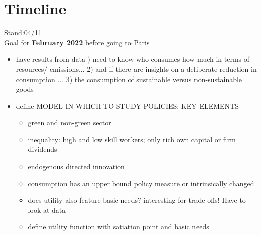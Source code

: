 \section{Timeline}



Stand:04/11 \\

Goal for \textbf{February 2022 }before going to Paris
\begin{itemize}

\item have results from data ) need to know who consumes how much in terms of resources/ emissions... 2) and if there are insights on a deliberate reduction in consumption ... 3) the consumption of sustainable versus non-sustainable goods
\item define MODEL IN WHICH TO STUDY POLICIES; KEY ELEMENTS
\begin{itemize}
\item green and non-green sector
\item inequality: high and low skill workers; only rich own capital or firm dividends
\item endogenous directed innovation 
\item consumption has an upper bound \ar policy measure or intrinsically changed
\item does utility also feature basic needs? \ar interesting for trade-offs! Have to look at data
\item define utility function with satiation point and basic needs
\end{itemize}

\end{itemize}
